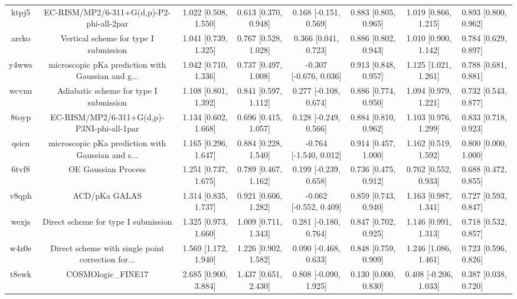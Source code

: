 \documentclass{article}
\begin{document}
\begin{center}
\begin{longtable}{|ccccccc|}
 ktpj5 &           EC-RISM/MP2/6-311+G(d,p)-P2-phi-all-2par &  1.022 [0.508, 1.550] &  0.613 [0.370, 0.948] &    0.168 [-0.151, 0.569] &  0.883 [0.805, 0.965] &   1.019 [0.866, 1.215] &  0.893 [0.800, 0.962] \\
 arcko &              Vertical scheme for type I submission &  1.041 [0.739, 1.325] &  0.767 [0.528, 1.028] &     0.366 [0.041, 0.723] &  0.886 [0.802, 0.943] &   1.010 [0.900, 1.142] &  0.784 [0.629, 0.897] \\
 y4wws &  microscopic pKa prediction with Gaussian and g... &  1.042 [0.710, 1.336] &  0.737 [0.497, 1.008] &   -0.307 [-0.676, 0.036] &  0.913 [0.848, 0.957] &   1.125 [1.021, 1.261] &  0.788 [0.681, 0.881] \\
 wcvnu &             Adiabatic scheme for type I submission &  1.108 [0.801, 1.392] &  0.841 [0.597, 1.112] &    0.277 [-0.108, 0.674] &  0.886 [0.774, 0.950] &   1.094 [0.979, 1.221] &  0.732 [0.543, 0.877] \\
 8toyp &         EC-RISM/MP2/6-311+G(d,p)-P3NI-phi-all-1par &  1.134 [0.602, 1.668] &  0.696 [0.415, 1.057] &    0.128 [-0.249, 0.566] &  0.884 [0.810, 0.962] &   1.103 [0.976, 1.299] &  0.833 [0.718, 0.923] \\
 qsicn &  microscopic pKa prediction with Gaussian and s... &  1.165 [0.296, 1.647] &  0.884 [0.228, 1.540] &   -0.764 [-1.540, 0.012] &  0.914 [0.457, 1.000] &   1.162 [0.519, 1.592] &  0.800 [0.000, 1.000] \\
 6tvf8 &                                OE Gaussian Process &  1.251 [0.737, 1.675] &  0.789 [0.467, 1.162] &    0.199 [-0.239, 0.658] &  0.736 [0.475, 0.912] &   0.762 [0.552, 0.933] &  0.688 [0.472, 0.855] \\
 v8qph &                                      ACD/pKa GALAS &  1.314 [0.835, 1.737] &  0.921 [0.606, 1.282] &   -0.062 [-0.552, 0.409] &  0.859 [0.743, 0.940] &   1.163 [0.987, 1.341] &  0.727 [0.593, 0.847] \\
 wexjs &                Direct scheme for type I submission &  1.325 [0.973, 1.660] &  1.009 [0.711, 1.343] &    0.281 [-0.180, 0.764] &  0.847 [0.702, 0.925] &   1.146 [0.991, 1.313] &  0.718 [0.532, 0.857] \\
 w4z0e &  Direct scheme with single point correction for... &  1.569 [1.172, 1.940] &  1.226 [0.902, 1.582] &    0.090 [-0.468, 0.633] &  0.848 [0.759, 0.909] &   1.246 [1.086, 1.461] &  0.723 [0.596, 0.826] \\
 t8ewk &                                 COSMOlogic\_FINE17 &  2.685 [0.900, 3.884] &  1.437 [0.651, 2.430] &    0.808 [-0.090, 1.925] &  0.130 [0.000, 0.830] &  0.408 [-0.206, 1.033] &  0.387 [0.038, 0.720] \\

\end{longtable}
\end{center}
\end{document}
